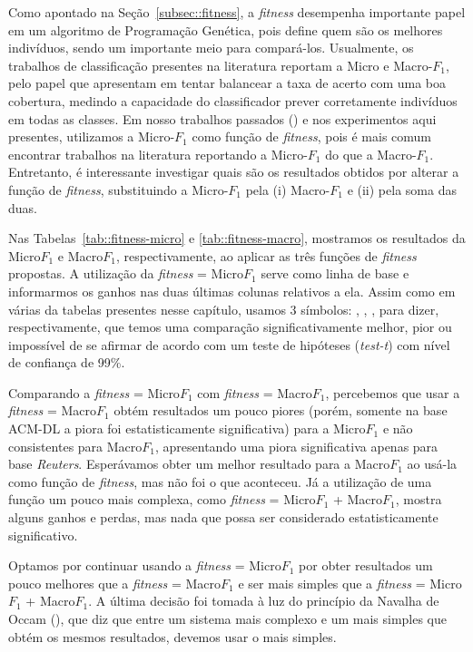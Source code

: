 Como apontado na Seção~\ref{subsec::fitness}, a \textit{fitness} desempenha importante papel em um algoritmo de Programação Genética, pois define quem são os melhores indivíduos, sendo um importante meio para compará-los.
Usualmente, os trabalhos de classificação presentes na literatura reportam a Micro e Macro-$F_1$, pelo papel que apresentam em tentar balancear a taxa de acerto com uma boa cobertura, medindo a capacidade do classificador prever corretamente indivíduos em todas as classes.
Em nosso trabalhos passados (\cite{Palotti10,Palotti11})
e nos experimentos aqui presentes, utilizamos a Micro-$F_1$ como função de \textit{fitness}, pois é mais comum encontrar trabalhos na literatura reportando a Micro-$F_1$ do que a Macro-$F_1$. Entretanto, é interessante investigar quais são os resultados obtidos por alterar a função de \textit{fitness}, substituindo a Micro-$F_1$ pela (i) Macro-$F_1$ e (ii) pela soma das duas.

Nas Tabelas~\ref{tab::fitness-micro} e \ref{tab::fitness-macro}, mostramos os resultados da Micro$F_1$ e Macro$F_1$, respectivamente, ao aplicar as três funções de \textit{fitness} propostas.
A utilização da \textit{fitness} = Micro$F_1$ serve como linha de base e informarmos os ganhos nas duas últimas colunas relativos a ela. 
Assim como em várias da tabelas presentes nesse capítulo, usamos 3 símbolos: \triangOK, \triangBAD, \ball, para dizer, respectivamente, que temos uma comparação significativamente melhor, pior ou impossível de se afirmar de acordo com um teste de hipóteses (\textit{test-t}) com nível de confiança de 99\%.  



Comparando a \textit{fitness} = Micro$F_1$ com \textit{fitness} = Macro$F_1$, percebemos que usar a \textit{fitness} = Macro$F_1$ obtém resultados um pouco piores (porém, somente na base \textsc{ACM-DL} a piora foi estatisticamente significativa) para a Micro$F_1$ e não consistentes para Macro$F_1$, apresentando uma piora significativa apenas para base \textit{Reuters}. Esperávamos obter um melhor resultado para a Macro$F_1$ ao usá-la como função de \textit{fitness}, mas não foi o que aconteceu.
Já a utilização de uma função um pouco mais complexa, como \textit{fitness} = Micro$F_1$ + Macro$F_1$, mostra alguns ganhos e perdas, mas nada que possa ser considerado estatisticamente significativo.


Optamos por continuar usando a \textit{fitness} = Micro$F_1$  
por obter resultados um pouco melhores que a \textit{fitness} = Macro$F_1$ e
ser mais simples que a \textit{fitness} = Micro$F_1$ + Macro$F_1$. A última decisão foi tomada à luz do princípio da Navalha de Occam (\cite{Blumer87}), que diz que entre um sistema mais complexo e um mais simples que obtém os mesmos resultados, devemos usar o mais simples.




